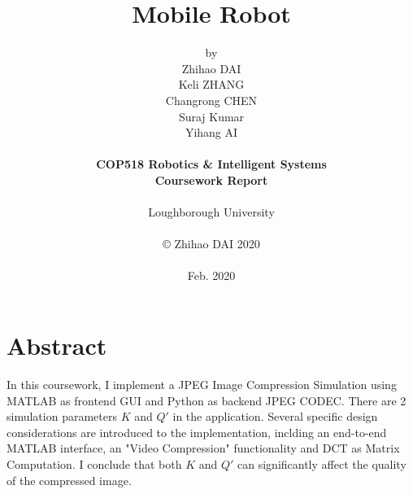 \title{\bf Mobile Robot}

\author{by\\Zhihao DAI\\
Keli ZHANG\\
Changrong CHEN\\
Suraj Kumar\\
Yihang AI\\
\\
{\bf COP518 Robotics \& Intelligent Systems}\\
{\bf Coursework Report}\\
\\
Loughborough University\\
\\
\copyright
\hspace{1 dd} Zhihao DAI 2020\\
\\
Feb. 2020
}
\date{} %

\maketitle


% 
% 

\chapter*{Abstract}
In this coursework, I implement a JPEG Image Compression Simulation using MATLAB as frontend GUI and Python as backend JPEG CODEC. There are 2 simulation parameters $K$ and $Q'$ in the application. 
Several specific design considerations are introduced to the implementation, inclding an end-to-end MATLAB interface, an "Video Compression" functionality and DCT as Matrix Computation.
I conclude that both $K$ and $Q'$ can significantly affect the quality of the compressed image.


